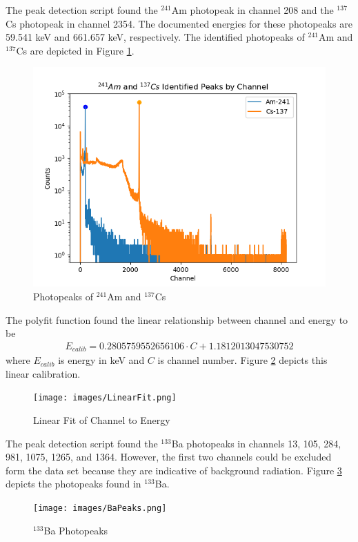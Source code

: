 The peak detection script found the $^{241}$Am photopeak in channel 208 and the $^{137}$Cs photopeak in channel 2354. The documented energies for these photopeaks are 59.541 keV  and 661.657 keV, respectively. The identified photopeaks of $^{241}$Am and $^{137}$Cs are depicted in Figure \ref{fig:Peaks}.

\begin{figure}[H]
\centering
\includegraphics[scale=0.8]{images/Peaks.png}
\caption{Photopeaks of $^{241}$Am and $^{137}$Cs}
\label{fig:Peaks}
\end{figure}

The polyfit function found the linear relationship between channel and energy to be
\begin{align}
E_{calib} = 0.2805759552656106\cdot C + 1.1812013047530752 \label{eq:1}
\end{align}
where $E_{calib}$ is energy in keV and $C$ is channel number. Figure \ref{fig:Fit} depicts this linear calibration.

\begin{figure}[H]
\centering
\texttt{[image: images/LinearFit.png]}
\caption{Linear Fit of Channel to Energy}
\label{fig:Fit}
\end{figure}

The peak detection script found the $^{133}$Ba photopeaks in channels 13, 105, 284, 981, 1075, 1265, and 1364. However, the first two channels could be excluded form the data set because they are indicative of background radiation. Figure \ref{fig:BaPeaks} depicts the photopeaks found in $^{133}$Ba.

\begin{figure}[H]
\centering
\texttt{[image: images/BaPeaks.png]}
\caption{$^{133}$Ba Photopeaks}
\label{fig:BaPeaks}
\end{figure}

